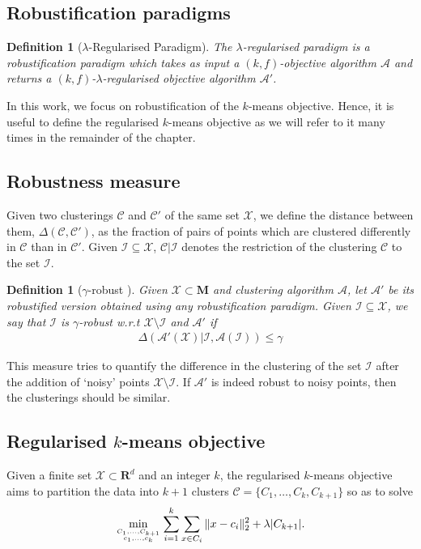\documentclass[12pt]{article}
\newcommand{\mc}{\mathcal}
\newcommand{\mb}{\mathbf}
\newtheorem{definition}[theorem]{Definition}
\begin{document}
\subsection{Robustification paradigms}
\begin{definition}[$\lambda$-Regularised Paradigm] The $\lambda$-regularised paradigm is a robustification paradigm which takes as input a $(k, f)$-objective algorithm $\mc A$ and returns a $(k, f)$-$\lambda$-regularised objective algorithm $\mc A'$.  
\end{definition}

In this work, we focus on robustification of the $k$-means objective. Hence, it is useful to define the regularised $k$-means objective as we will refer to it many times in the remainder of the chapter. 

\subsection{Robustness measure}
Given two clusterings $\mc C$ and $\mc C'$ of the same set $\mc X$, we define the distance between them, $\Delta(\mc C, \mc C')$, as the fraction of pairs of points which are clustered differently in $\mc C$ than in $\mc C'$. %
Given $\mc I \subseteq \mc X$, $\mc C|\mc I$ denotes the restriction of the clustering $\mc C$ to the set $\mc I$.

\begin{definition}[$\gamma$-robust \cite{ben2014clustering}]
Given $\mc X\subset \mb M$ and clustering algorithm $\mc A$, let $\mc A'$ be its robustified version obtained using any robustification paradigm. Given $\mc I \subseteq \mc X$, we say that $\mc I$ is $\gamma$-robust w.r.t $\mc X \setminus \mc I$ and $\mc A'$ if 
\begin{align}
\Delta(\mc A'(\mc X)|\mc I, \mc A(\mc I)) \le \gamma
\end{align}
\end{definition}
This measure tries to quantify the difference in the clustering of the set $\mc I$ after the addition of `noisy' points $\mc X \setminus \mc I$. If $\mc A'$ is indeed robust to noisy points, then the clusterings should be similar. 

\subsection{Regularised $k$-means objective}
Given a finite set $\mc X \subset \mb R^{d}$ and an integer $k$, the regularised $k$-means objective aims to partition the data into $k+1$ clusters $\mc C = \{C_1, \ldots, C_{k}, C_{k+1}\}$ so as to solve 
\begin{align}
	\min_{C_1,\ldots, C_{k+1} \atop c_1, \ldots, c_k} \sum_{i=1}^k \sum_{x \in C_i} \|x-c_i\|_2^2 + \lambda |C_{k+1}|.
	\label{eqn:modifiedkmeans}
\end{align}
\end{document}
